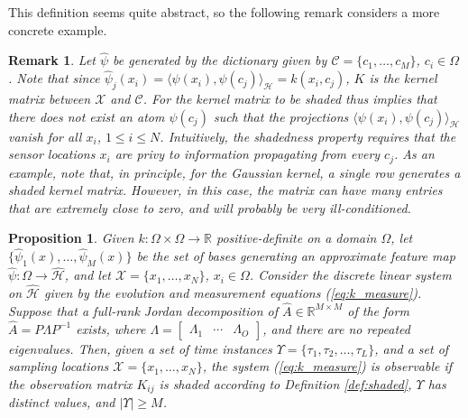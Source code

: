 \documentclass[letterpaper,12pt,peerreviewca,draftcls]{IEEEtran}
\newtheorem{proposition}{Proposition}
\newtheorem{remark}{Remark}
\newcommand{\R}{\mathbb{R}}
\def\l{\langle}
\def\r{\rangle}
\newcommand{\fspace}{\mathcal{H}}
\newcommand{\fmap}{\psi}
\newcommand{\kernel}{k}
\newcommand{\empK}{\ensuremath{K}}
\newcommand{\dom}{\Omega}
\newcommand{\sampSet}{\mathcal{X}}
\newcommand{\sampSetLong}{\{x_1, \dots, x_{\nsamp}\}}
\newcommand{\nsamp}{N}
\newcommand{\ncent}{M}
\newcommand{\shCent}{\mathcal{C}}
\newcommand{\shCentLong}{\{c_1,\dots,c_{\ncent}\}}
\renewcommand{\eqref}[1]{(\ref{eq:#1})}
\def\l{\langle}
\def\r{\rangle}
\newcommand{\otime}{L}
\newcommand{\JorMul}{O}
\newcommand{\Tset}{\Upsilon}
\newcommand{\JorP}{P}
\newcommand{\JorLa}{\Lambda}
\newcommand{\fspaceApprox}{\widehat{\fspace}}
\newcommand{\fmapApprox}{\widehat{\fmap}}
\newcommand{\obsMat}{\empK}
\newcommand{\dualop}{A}
\newcommand{\dualopApprox}{\widehat{\dualop}}
\newcommand{\tindex}{\tau}
\begin{document}
This definition seems quite abstract, so the following remark considers a more concrete example.

\begin{remark}\label{rem:shaded}
 Let $\fmapApprox$ be generated by the dictionary given by $\shCent = \shCentLong$, $c_i\in\dom$. Note that since $\fmapApprox_j(x_i) = \l\fmap(x_i), \fmap(c_j)\r_{\fspace} = \kernel(x_i,c_j)$, $\obsMat$ is the kernel matrix between $\sampSet$ and $\shCent$. For the kernel matrix to be shaded thus implies that there does not exist an atom $\fmap(c_j)$ such that the projections $\l\fmap(x_i),\fmap(c_j)\r_{\fspace}$ vanish for all $x_i$, $1\leq i\leq \nsamp$. Intuitively, the shadedness property requires that the sensor locations $x_i$ are privy to information propagating from every $c_j$. As an example, note that, in principle, for the Gaussian kernel, a single row generates a shaded kernel matrix. However, in this case, the matrix can have many entries that are extremely close to zero, and will probably be very ill-conditioned.  
\end{remark}


\begin{proposition}\label{prop:1}
Given $\kernel:\dom\times\dom\to\R$ positive-definite on a domain $\dom$, let $\{\fmapApprox_1(x), \dots, \fmapApprox_{\ncent}(x)\}$ be the set of bases generating an approximate feature map $\fmapApprox:\dom\to\fspaceApprox$, and let
$\sampSet = \sampSetLong$, $x_i\in\dom$. Consider the discrete linear system on $\fspaceApprox$ given by the evolution and measurement equations \eqref{k_measure}. Suppose that a full-rank Jordan decomposition of $\dualopApprox\in\R^{\ncent\times\ncent}$ of the form $\dualopApprox = \JorP\JorLa\JorP^{-1}$ exists, where $\JorLa = 
\left[\begin{smallmatrix}\JorLa_1 &\cdots & \JorLa_{\JorMul}\end{smallmatrix}\right]$,
and there are no repeated eigenvalues. Then, given a set of time instances  $\Tset = \{\tindex_1,\tindex_2,\dots,\tindex_{\otime}\}$, and a set of sampling locations $\sampSet=\sampSetLong$,
the system \eqref{k_measure} is observable if the observation matrix $\empK_{ij}$ is shaded according to Definition \ref{def:shaded},
$\Tset$ has distinct values, and $|\Tset| \geq \ncent$.
\end{proposition}
\end{document}

